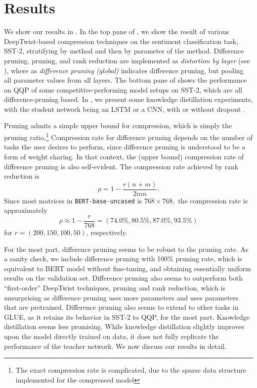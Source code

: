 \documentclass[10pt]{article}
\begin{document}
\section{Results}

We show our results in . In the top
pane of , we show the result of various
DeepTwist-based compression techniques on the sentiment classification task,
SST-2, stratifying by method and then by parameter of the method. Difference
pruning, pruning, and rank reduction are implemented as \emph{distortion by
layer} (see ), where as \emph{difference pruning (global)}
indicates difference pruning, but pooling all parameter values from all layers.
The bottom pane of  shows the performance on QQP of
some competitive-performing model setups on SST-2, which are all
difference-pruning based. In , we present some knowledge
distillation experiments, with the student network being an LSTM or a CNN, with
or without dropout \citep{kim2014convolutional}. 

Pruning admits a simple upper bound for compression, which is simply the
pruning ratio.\footnote{The exact compression rate is complicated, due to
the sparse data structure implemented for the compressed model} Compression
rate for difference pruning depends on the number of tasks the user
desires to perform, since difference pruning is understood to be a form of
weight sharing. In that context, the (upper bound) compression rate of
difference
pruning
is also self-evident. The compression rate achieved by rank reduction is \[
\rho = 1 - \frac{r(n+m)}{2mn}.
\]
Since most matrices in \texttt{BERT-base-uncased} is $768\times 768,$ the
compression rate is approximately \[
\rho \approx 1 - \frac{r}{768} = (74.0\%,
80.5\%,
87.0\%,
93.5\%)
\]
for $r = (200,150,100,50)$, respectively.
 
For the most part, difference pruning seems to be robust to the pruning
rate. As a sanity check, we include difference pruning with 100\% pruning
rate, which is equivalent to BERT model without fine-tuning, and obtaining
essentially uniform results on the validation set. Difference pruning also
seems to outperform both ``first-order'' DeepTwist techniques, pruning and
rank reduction, which is unsurprising as difference pruning uses more
parameters and uses parameters that are pretrained. Difference pruning also
seems to extend to other tasks in GLUE, as it retains its behavior in
SST-2 to QQP, for the most part. Knowledge distillation seems less
promising. While knowledge distillation
slightly improves upon the model directly trained on data, it does not
fully replicate the performance of the teacher network. We now discuss our
results in detail.
\end{document}
